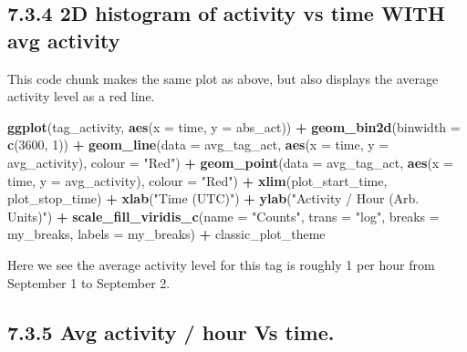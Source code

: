 \documentclass[
]{book}
\newenvironment{Shaded}{\begin{snugshade}}{\end{snugshade}}
\newcommand{\AttributeTok}[1]{\textcolor[rgb]{0.13,0.29,0.53}{#1}}
\newcommand{\DecValTok}[1]{\textcolor[rgb]{0.00,0.00,0.81}{#1}}
\newcommand{\FunctionTok}[1]{\textcolor[rgb]{0.13,0.29,0.53}{\textbf{#1}}}
\newcommand{\NormalTok}[1]{#1}
\newcommand{\SpecialCharTok}[1]{\textcolor[rgb]{0.81,0.36,0.00}{\textbf{#1}}}
\newcommand{\StringTok}[1]{\textcolor[rgb]{0.31,0.60,0.02}{#1}}
\begin{document}
\subsection{7.3.4 2D histogram of activity vs time WITH avg activity}\label{d-histogram-of-activity-vs-time-with-avg-activity}

This code chunk makes the same plot as above, but also displays the average activity level as a red line.

\begin{Shaded}
\begin{Highlighting}[]
\FunctionTok{ggplot}\NormalTok{(tag\_activity, }
       \FunctionTok{aes}\NormalTok{(}\AttributeTok{x =}\NormalTok{ time, }
           \AttributeTok{y =}\NormalTok{ abs\_act)) }\SpecialCharTok{+}
 \FunctionTok{geom\_bin2d}\NormalTok{(}\AttributeTok{binwidth =} \FunctionTok{c}\NormalTok{(}\DecValTok{3600}\NormalTok{, }\DecValTok{1}\NormalTok{)) }\SpecialCharTok{+}
  \FunctionTok{geom\_line}\NormalTok{(}\AttributeTok{data =}\NormalTok{ avg\_tag\_act, }
            \FunctionTok{aes}\NormalTok{(}\AttributeTok{x =}\NormalTok{ time, }
                \AttributeTok{y =}\NormalTok{ avg\_activity),}
            \AttributeTok{colour =} \StringTok{"Red"}\NormalTok{) }\SpecialCharTok{+}
  \FunctionTok{geom\_point}\NormalTok{(}\AttributeTok{data =}\NormalTok{ avg\_tag\_act, }
             \FunctionTok{aes}\NormalTok{(}\AttributeTok{x =}\NormalTok{ time, }
                 \AttributeTok{y =}\NormalTok{ avg\_activity), }
             \AttributeTok{colour =} \StringTok{"Red"}\NormalTok{) }\SpecialCharTok{+}
  \FunctionTok{xlim}\NormalTok{(plot\_start\_time, plot\_stop\_time) }\SpecialCharTok{+}
  \FunctionTok{xlab}\NormalTok{(}\StringTok{"Time (UTC)"}\NormalTok{) }\SpecialCharTok{+}
  \FunctionTok{ylab}\NormalTok{(}\StringTok{"Activity / Hour (Arb. Units)"}\NormalTok{) }\SpecialCharTok{+}
  \FunctionTok{scale\_fill\_viridis\_c}\NormalTok{(}\AttributeTok{name =} \StringTok{"Counts"}\NormalTok{, }
                       \AttributeTok{trans =} \StringTok{"log"}\NormalTok{, }
                       \AttributeTok{breaks =}\NormalTok{ my\_breaks, }
                       \AttributeTok{labels =}\NormalTok{ my\_breaks) }\SpecialCharTok{+}
\NormalTok{  classic\_plot\_theme}
\end{Highlighting}
\end{Shaded}

Here we see the average activity level for this tag is roughly 1 per hour from September 1 to September 2.

\subsection{7.3.5 Avg activity / hour Vs time.}\label{avg-activity-hour-vs-time.}
\end{document}
